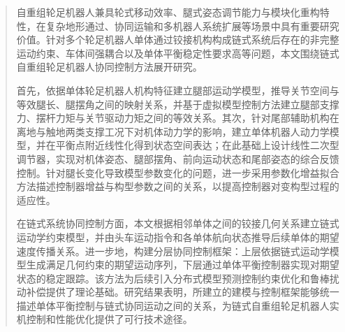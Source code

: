 
\begin{abstract}
自重组轮足机器人兼具轮式移动效率、腿式姿态调节能力与模块化重构特性，在复杂地形通过、协同运输和多机器人系统扩展等场景中具有重要研究价值。针对多个轮足机器人单体通过铰接机构构成链式系统后存在的非完整运动约束、车体间强耦合以及单体平衡稳定性要求高等问题，本文围绕链式自重组轮足机器人协同控制方法展开研究。

首先，依据单体轮足机器人机构特征建立腿部运动学模型，推导关节空间与等效腿长、腿摆角之间的映射关系，并基于虚拟模型控制方法建立腿部支撑力、摆杆力矩与关节驱动力矩之间的等效关系。其次，针对尾部辅助机构在离地与触地两类支撑工况下对机体动力学的影响，建立单体机器人动力学模型，并在平衡点附近线性化得到状态空间表达；在此基础上设计线性二次型调节器，实现对机体姿态、腿部摆角、前向运动状态和尾部姿态的综合反馈控制。针对腿长变化导致模型参数变化的问题，进一步采用参数化增益拟合方法描述控制器增益与构型参数之间的关系，以提高控制器对变构型过程的适应性。

在链式系统协同控制方面，本文根据相邻单体之间的铰接几何关系建立链式运动学约束模型，并由头车运动指令和各单体航向状态推导后续单体的期望速度传播关系。进一步地，构建分层协同控制框架：上层依据链式运动学模型生成满足几何约束的期望运动序列，下层通过单体平衡控制器实现对期望状态的稳定跟踪。该方法为后续引入分布式模型预测控制约束优化和鲁棒扰动补偿提供了理论基础。研究结果表明，所建立的建模与控制框架能够统一描述单体平衡控制与链式协同运动之间的关系，为链式自重组轮足机器人实机控制和性能优化提供了可行技术途径。

\end{abstract}


